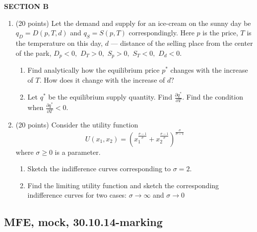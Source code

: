 \documentclass[12pt]{article} %
\theoremstyle{definition} %
\begin{document}
\textbf{SECTION B}

\begin{enumerate}[resume]
\item (20 points) Let the demand and supply for an ice-cream on the sunny day be $q_D=D(p, T, d)$ and $q_S=S(p,T)$ correspondingly. Here $p$ is the price, $T$ is the temperature on this day, $d$ --- distance of the selling place from the center of the park, $D_p<0,$ $D_T>0,$ $S_p>0,$ $S_T<0,$ $D_d<0.$

\begin{enumerate}
\item Find analytically how the equilibrium price $p^{\ast}$ changes with the increase of $T.$ How does it change with the increase of $d?$
\item Let $q^{\ast}$ be the equilibrium supply quantity. Find $\frac{\partial{q^{\ast}}}{\partial T}.$ Find the condition when $\frac{\partial{q^{\ast}}}{\partial T}<0.$
\end{enumerate}

\item (20 points) Consider the utility function
$$
U(x_1, x_2) = \left(x_1^\frac{\sigma-1}{\sigma}+x_2^\frac{\sigma-1}{\sigma}\right)^\frac{\sigma}{\sigma-1}
$$
where $\sigma \geq 0$ is a parameter.

\begin{enumerate}
\item Sketch the indifference curves corresponding to $\sigma=2$.
\item Find the limiting utility function and sketch the corresponding indifference curves for two cases: $\sigma \rightarrow \infty$ and $\sigma \rightarrow 0$
\end{enumerate}
\end{enumerate}

\subsection{MFE, mock, 30.10.14-marking}
\end{document}
